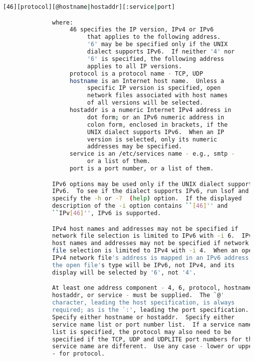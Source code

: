 {{\begin{lstlisting}[language=bash]
              [46][protocol][@hostname|hostaddr][:service|port]

              where:
                   46 specifies the IP version, IPv4 or IPv6
                        that applies to the following address.
                        '6' may be be specified only if the UNIX
                        dialect supports IPv6.  If neither '4' nor
                        '6' is specified, the following address
                        applies to all IP versions.
                   protocol is a protocol name - TCP, UDP
                   hostname is an Internet host name.  Unless a
                        specific IP version is specified, open
                        network files associated with host names
                        of all versions will be selected.
                   hostaddr is a numeric Internet IPv4 address in
                        dot form; or an IPv6 numeric address in
                        colon form, enclosed in brackets, if the
                        UNIX dialect supports IPv6.  When an IP
                        version is selected, only its numeric
                        addresses may be specified.
                   service is an /etc/services name - e.g., smtp -
                        or a list of them.
                   port is a port number, or a list of them.

              IPv6 options may be used only if the UNIX dialect supports
              IPv6.  To see if the dialect supports IPv6, run lsof and
              specify the -h or -?  (help) option.  If the displayed
              description of the -i option contains ``[46]'' and
              ``IPv[46]'', IPv6 is supported.

              IPv4 host names and addresses may not be specified if
              network file selection is limited to IPv6 with -i 6.  IPv6
              host names and addresses may not be specified if network
              file selection is limited to IPv4 with -i 4.  When an open
              IPv4 network file's address is mapped in an IPv6 address,
              the open file's type will be IPv6, not IPv4, and its
              display will be selected by '6', not '4'.

              At least one address component - 4, 6, protocol, hostname,
              hostaddr, or service - must be supplied.  The `@'
              character, leading the host specification, is always
              required; as is the `:', leading the port specification.
              Specify either hostname or hostaddr.  Specify either
              service name list or port number list.  If a service name
              list is specified, the protocol may also need to be
              specified if the TCP, UDP and UDPLITE port numbers for the
              service name are different.  Use any case - lower or upper
              - for protocol.


\end{lstlisting}}}
